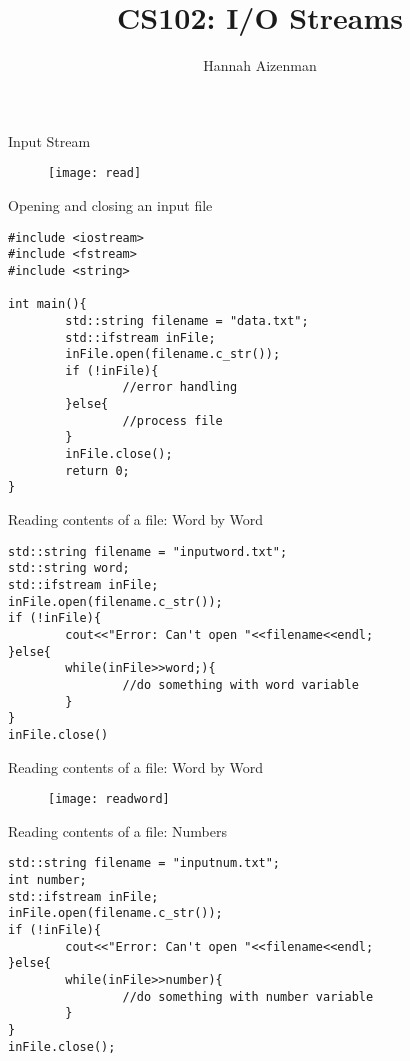 \documentclass[xcolor={dvipsnames}]{beamer}
\begin{document}
\title{ CS102: I/O Streams}
\author{Hannah Aizenman}



\begin{frame}
	\titlepage
\end{frame}

\begin{frame}{Input Stream}
	\begin{figure}
		\texttt{[image: read]}
	\end{figure}
\end{frame}

\begin{frame}[fragile]{Opening and closing an input file}
\begin{verbatim}	
#include <iostream>
#include <fstream>
#include <string>

int main(){
        std::string filename = "data.txt";
        std::ifstream inFile;
        inFile.open(filename.c_str());
        if (!inFile){
                //error handling
        }else{
                //process file
        }
        inFile.close();
        return 0;
}
\end{verbatim}
\end{frame}

\begin{frame}[fragile]{Reading contents of a file: Word by Word}
\begin{verbatim}
std::string filename = "inputword.txt";
std::string word;
std::ifstream inFile;
inFile.open(filename.c_str());
if (!inFile){
        cout<<"Error: Can't open "<<filename<<endl;
}else{
        while(inFile>>word;){
                //do something with word variable
        }
}
inFile.close()
\end{verbatim}
\end{frame}

\begin{frame}{Reading contents of a file: Word by Word}
	\begin{figure}
		\texttt{[image: readword]}
	\end{figure}
\end{frame}


\begin{frame}[fragile]{Reading contents of a file: Numbers}
\begin{verbatim}
std::string filename = "inputnum.txt";
int number;
std::ifstream inFile;
inFile.open(filename.c_str());
if (!inFile){
        cout<<"Error: Can't open "<<filename<<endl;
}else{
        while(inFile>>number){
                //do something with number variable
        }
}
inFile.close();
\end{verbatim}
\end{frame}
\end{document}
